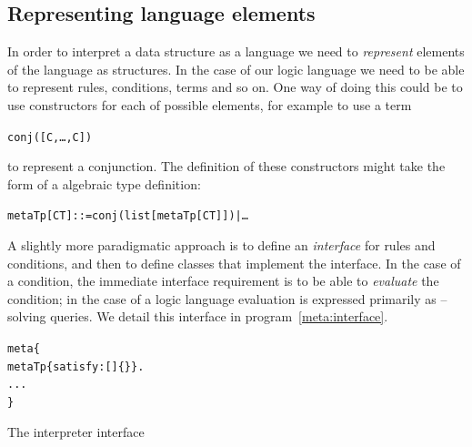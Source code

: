 \subsection{Representing language elements}
\label{meta:type}
In order to interpret a data structure as a language we need to \emph{represent} elements of the language as \go structures. In the case of our logic language we need to be able to represent rules, conditions, terms and so on. One way of doing this could be to use constructors for each of possible elements, for example to use a term
\begin{alltt}
conj([ C, \ldots, C\subn])
\end{alltt}
to represent a conjunction. The definition of these constructors might take the form of a algebraic type definition:
\begin{alltt}
metaTp[CT] ::=  conj(list[metaTp[CT]]) | \ldots
\end{alltt}
A slightly more paradigmatic approach is to define an \emph{interface} for rules and conditions, and then to define classes that implement the interface. In the case of a condition, the immediate interface requirement is to be able to \emph{evaluate} the condition; in the case of a logic language evaluation is expressed primarily as  -- solving queries. We detail this interface in program~\ref{meta:interface}.
\begin{program}
\vspace{0.5ex}
\begin{alltt}
meta\{
  metaTp \impl \{ satisfy:[]\{\} \}.
  ...
\}
\end{alltt}
\vspace{-2ex}
\caption{The interpreter interface}
\label{meta:interface}
\end{program}

